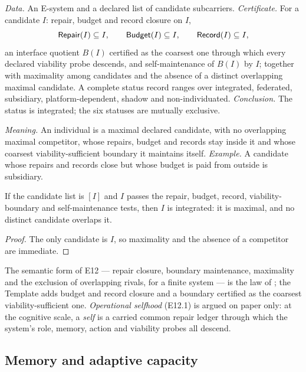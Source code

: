 \begin{schema}[E12: individuation]\label{tmpl:e12}
\emph{Data.} An E-system and a declared list of candidate subcarriers.
\emph{Certificate.} For a candidate $I$: repair, budget and record closure on $I$,
\[
  \mathsf{Repair}(I) \subseteq I, \qquad \mathsf{Budget}(I) \subseteq I, \qquad \mathsf{Record}(I) \subseteq I,
\]
an interface quotient $B(I)$ certified as the coarsest one through which every declared viability
probe descends, and self-maintenance of $B(I)$ by $I$; together with maximality among candidates
and the absence of a distinct overlapping maximal candidate. A complete status record ranges over
integrated, federated, subsidiary, platform-dependent, shadow and non-individuated.
\emph{Conclusion.} The status is integrated; the six statuses are mutually exclusive.
\end{schema}

\emph{Meaning.} An individual is a maximal declared candidate, with no overlapping maximal competitor,
whose repairs, budget and records stay inside it and whose coarsest viability-sufficient boundary it
maintains itself.
\emph{Example.} A candidate whose repairs and records close but whose budget is paid from outside is
subsidiary.

\begin{proposition}\label{prop:e12-singleton}
If the candidate list is $[I]$ and $I$ passes the repair, budget, record, viability-boundary and
self-maintenance tests, then $I$ is integrated: it is maximal, and no distinct candidate overlaps it.
\end{proposition}

\begin{proof}
The only candidate is $I$, so maximality and the absence of a competitor are immediate.
\end{proof}

The semantic form of E12 --- repair closure, boundary maintenance, maximality and the exclusion of
overlapping rivals, for a finite system --- is the law of ; the Template adds
budget and record closure and a boundary certified as the coarsest viability-sufficient one.
\emph{Operational selfhood} (E12.1) is argued on paper only: at the cognitive scale, a \emph{self}
is a carried common repair ledger through which the system's role, memory, action and viability
probes all descend.

\subsection{Memory and adaptive capacity}\label{sec:tmpl-memory}

